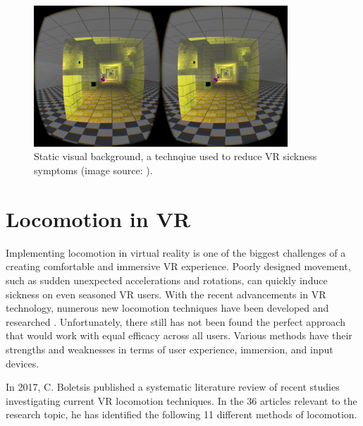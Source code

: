 \begin{figure}[th]
\centering
\includegraphics[width=0.85\textwidth]{img/static_background.png}
\caption{Static visual background, a technqiue used to reduce VR sickness symptoms (image source: \cite{STATICBACKGROUND}).}
\label{fig:STATIC_BACKGROUND}
\end{figure}

\section{Locomotion in VR}
Implementing locomotion in virtual reality is one of the biggest challenges of a creating comfortable and immersive VR experience. Poorly designed movement, such as sudden unexpected accelerations and rotations, can quickly induce sickness on even seasoned VR users. With the recent advancements in VR technology, numerous new locomotion techniques have been developed and researched \cite{VRHCI}. Unfortunately, there still has not been found the perfect approach that would work with equal efficacy across all users. Various methods have their strengths and weaknesses in terms of user experience, immersion, and input devices. 

In 2017, C. Boletsis published a systematic literature review \cite{LOCOMOTIONREVIEW} of recent studies investigating current VR locomotion techniques. In the 36 articles relevant to the research topic, he has identified the following 11 different methods of locomotion. 

